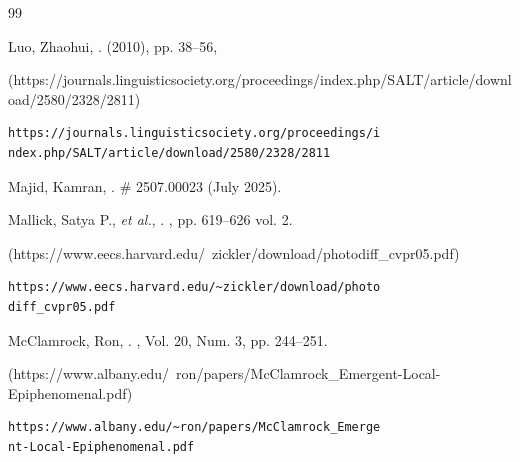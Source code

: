 \begin{thebibliography}{99}
{\begin{bItem}[ZhaohuiLuo]
Luo, Zhaohui,
.
  (2010), pp. 38--56, 
%
\begin{boxurl}(https://journals.linguisticsociety.org/proceedings/index.php/SALT/article/download/2580/2328/2811)
\begin{lstlisting}
https://journals.linguisticsociety.org/proceedings/i
ndex.php/SALT/article/download/2580/2328/2811
\end{lstlisting}
\end{boxurl}\end{bItem}



 \condenlargepage{2.5em}



\begin{bItem}[KamranMajid]
Majid, Kamran,
.
 \# 2507.00023 (July 2025). 
%
\end{bItem}




\begin{bItem}[Mallickelal]
Mallick, Satya P., \textit{et al.},
.
, 
pp. 619--626 vol. 2. 
%
\begin{boxurl}(https://www.eecs.harvard.edu/~zickler/download/photodiff_cvpr05.pdf)
\begin{lstlisting}
https://www.eecs.harvard.edu/~zickler/download/photo
diff_cvpr05.pdf
\end{lstlisting}
\end{boxurl}\end{bItem}



\begin{bItem}[RonMcClamrock]
McClamrock, Ron,
.
, 
Vol. 20, Num. 3, pp. 244--251.
%
\begin{boxurl}(https://www.albany.edu/~ron/papers/McClamrock_Emergent-Local-Epiphenomenal.pdf)
\begin{lstlisting}
https://www.albany.edu/~ron/papers/McClamrock_Emerge
nt-Local-Epiphenomenal.pdf
\end{lstlisting}
\end{boxurl}\end{bItem}


}
\end{thebibliography}
